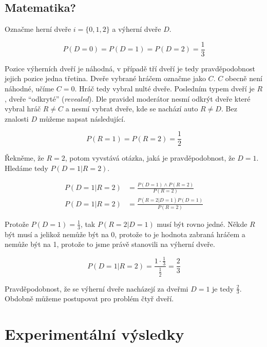 \subsection{Matematika?}

Označme herní dveře \( i = \{0, 1, 2\}\) a výherní dveře \( D \).

\begin{equation}
    P(D = 0) = P(D = 1) = P(D = 2) = \frac{1}{3}
\end{equation}

Pozice výherních dveří je náhodná, v případě tří dveří je tedy pravděpodobnost jejich pozice jedna třetina.
Dveře vybrané hráčem označme jako \( C \).
\( C \) obecně není náhodné, učíme \( C = 0 \).
Hráč tedy vybral nulté dveře.
Posledním typem dveří je \( R \), dveře \enquote{odkryté} (\textit{revealed}).
Dle pravidel moderátor nesmí odkrýt dveře které vybral hráč \( R \neq C \) a nesmí vybrat dveře, kde se nachází auto \( R \neq D \).
Bez znalosti \( D \) můžeme napsat následující.

\begin{equation}
    P(R = 1) = P(R = 2) = \frac{1}{2}
\end{equation}

Řekněme, že \( R = 2 \), potom vyvstává otázka, jaká je pravděpodobnost, že \( D = 1 \).
Hledáme tedy \( P(D = 1 | R = 2) \).

\begin{align}
    P(D = 1 | R = 2) &= \frac{P(D = 1) \land P(R = 2)}{P(R = 2)} \\
    P(D = 1 | R = 2) &= \frac{P(R = 2 | D = 1) P(D = 1)}{P(R = 2)}
\end{align}

Protože \( P(D = 1) = \frac{1}{3} \), tak \( P(R = 2 | D = 1) \) musí být rovno jedné.
Někde \( R \) být musí a jelikož nemůže být na 0, protože to je hodnota zabraná hráčem a nemůže být na 1, protože to jsme právě stanovili na výherní dveře.

\begin{equation}
    P(D = 1 | R = 2) = \frac{1 \cdot \frac{1}{3}}{\frac{1}{2}} = \frac{2}{3}
\end{equation}

Pravděpodobnost, že se výherní dveře nacházejí za dveřmi \( D = 1 \) je tedy \( \frac{2}{3} \).
Obdobně můžeme postupovat pro problém čtyř dveří.

\section{Experimentální výsledky}

